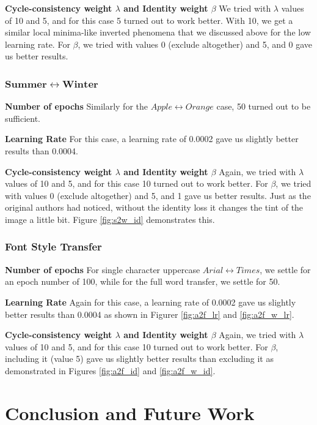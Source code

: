 \documentclass[10pt,twocolumn,letterpaper]{article}
\begin{document}
\noindent\textbf{Cycle-consistency weight $\lambda$ and Identity weight $\beta$} We tried with $\lambda$
values of 10 and 5, and for this case 5 turned out to work better. With 10, we get a similar local minima-like inverted phenomena that we discussed above for the low learning rate. For $\beta$, we tried 
with values 0 (exclude altogether) and 5, and 0 gave us better results.

\subsubsection{$\mathbf{Summer \leftrightarrow Winter}$}
\noindent\textbf{Number of epochs} Similarly for the $Apple \leftrightarrow Orange$ case, 50 turned out to be sufficient.

\noindent\textbf{Learning Rate} For this case, a learning rate of 0.0002 gave us slightly better results than 0.0004.

\noindent\textbf{Cycle-consistency weight $\lambda$ and Identity weight $\beta$} Again, we tried with 
$\lambda$ values of 10 and 5, and for this case 10 turned out to work better. For $\beta$, we tried 
with values 0 (exclude altogether) and 5, and 1 gave us better results. Just as the original authors \cite{cyclegan} had noticed, without the identity loss it changes the tint of the image a little bit. Figure \ref{fig:s2w_id} demonstrates this. 

\subsubsection{Font Style Transfer}
\noindent\textbf{Number of epochs} For single character uppercase $Arial \leftrightarrow Times$, we settle for an epoch number of 100, while for the full word transfer, we settle for 50.

\noindent\textbf{Learning Rate} Again for this case, a learning rate of 0.0002 gave us slightly better results than 0.0004 as shown in Figurer \ref{fig:a2f_lr} and \ref{fig:a2f_w_lr}.

\noindent\textbf{Cycle-consistency weight $\lambda$ and Identity weight $\beta$} Again, we tried with 
$\lambda$ values of 10 and 5, and for this case 10 turned out to work better. For $\beta$, including it (value 5) gave us slightly better results than excluding it as demonstrated in Figures \ref{fig:a2f_id} and \ref{fig:a2f_w_id}.

\section{Conclusion and Future Work}
\end{document}
